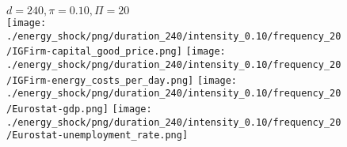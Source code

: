 \begin{figure}[ht!]
\centering\leavevmode
\begin{minipage}{17cm}
\centering\leavevmode
{$d=240, \pi=0.10, \Pi=20$}\\
\texttt{[image: ./energy\_shock/png/duration\_240/intensity\_0.10/frequency\_20/IGFirm-capital\_good\_price.png]}
\texttt{[image: ./energy\_shock/png/duration\_240/intensity\_0.10/frequency\_20/IGFirm-energy\_costs\_per\_day.png]}
\texttt{[image: ./energy\_shock/png/duration\_240/intensity\_0.10/frequency\_20/Eurostat-gdp.png]}
\texttt{[image: ./energy\_shock/png/duration\_240/intensity\_0.10/frequency\_20/Eurostat-unemployment\_rate.png]}
\end{minipage}
\end{figure}

